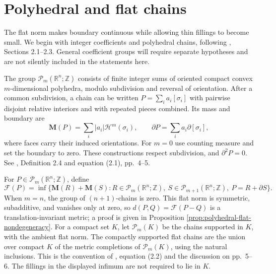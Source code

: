 \chapter{Polyhedral and flat chains}\label{sec:flat-chains}
The flat norm makes boundary continuous while allowing thin fillings to become small. We begin with integer coefficients and polyhedral chains, following \cite{WhiCho14}, Sections 2.1--2.3. General coefficient groups will require separate hypotheses and are not silently included in the statements here.

\begin{definition}\label{def:polyhedral-chain}
The group $\mathcal{P}_m(\mathbb{R}^n;\mathbb{Z})$ consists of finite integer sums of oriented compact convex $m$-dimensional polyhedra, modulo subdivision and reversal of orientation. After a common subdivision, a chain can be written $P=\sum_i a_i[\sigma_i]$ with pairwise disjoint relative interiors and with repeated pieces combined. Its mass and boundary are
\[
 \mathbf{M}(P)=\sum_i|a_i|\mathcal{H}^m(\sigma_i),\qquad
 \partial P=\sum_i a_i\partial[\sigma_i],
\]
where faces carry their induced orientations. For $m=0$ use counting measure and set the boundary to zero. These constructions respect subdivision, and $\partial^2P=0$. See \cite{WhiCho14}, Definition 2.4 and equation (2.1), pp.~4--5.
\end{definition}

\begin{definition}\label{def:flat-norm}
For $P\in\mathcal{P}_m(\mathbb{R}^n;\mathbb{Z})$, define
\[
 \mathcal{F}(P)=\inf\{\mathbf{M}(R)+\mathbf{M}(S):
 R\in\mathcal{P}_m(\mathbb{R}^n;\mathbb{Z}),\
 S\in\mathcal{P}_{m+1}(\mathbb{R}^n;\mathbb{Z}),\ P=R+\partial S\}.
\]
When $m=n$, the group of $(n+1)$-chains is zero. This flat norm is symmetric, subadditive, and vanishes only at zero, so $d(P,Q)=\mathcal F(P-Q)$ is a translation-invariant metric; a proof is given in Proposition \ref{prop:polyhedral-flat-nondegeneracy}. For a compact set $K$, let $\mathcal{P}_m(K)$ be the chains supported in $K$, with the ambient flat norm. The compactly supported flat chains are the union over compact $K$ of the metric completions of $\mathcal{P}_m(K)$, using the natural inclusions. This is the convention of \cite{WhiCho14}, equation (2.2) and the discussion on pp.~5--6. The fillings in the displayed infimum are not required to lie in $K$.
\end{definition}

